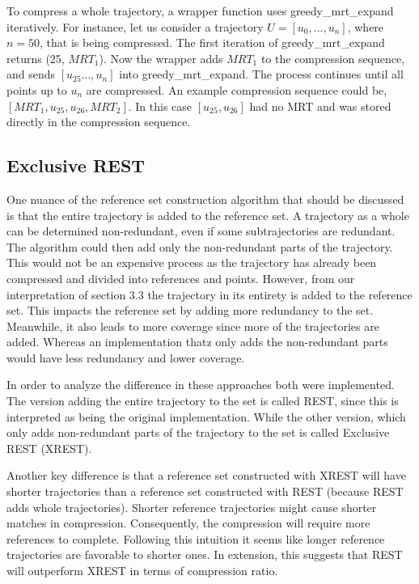 To compress a whole trajectory, a wrapper function uses greedy\_mrt\_expand iteratively. For instance, let us consider a trajectory $U = [u_0, ..., u_n]$, where $n = 50$, that is being compressed. The first iteration of greedy\_mrt\_expand returns (25, $MRT_1$). Now the wrapper adds $MRT_1$ to the compression sequence, and sends $[u_{25} ..., u_n]$ into greedy\_mrt\_expand. The process continues until all points up to $u_n$ are compressed. An example compression sequence could be, $[MRT_1, u_{25}, u_{26}, MRT_2]$. In this case $[u_{25}, u_{26}]$ had no MRT and was stored directly in the compression sequence.

\subsection{Exclusive REST}
One nuance of the reference set construction algorithm that should be discussed is that the entire trajectory is added to the reference set. A trajectory as a whole can be determined non-redundant, even if some subtrajectories are redundant. The algorithm could then add only the non-redundant parts of the trajectory. This would not be an expensive process as the trajectory has already been compressed and divided into references and points. However, from our interpretation of \cite{zhao2018rest} section 3.3 the trajectory in its entirety is added to the reference set. This impacts the reference set by adding more redundancy to the set. Meanwhile, it also leads to more coverage since more of the trajectories are added. Whereas an implementation thatz only adds the non-redundant parts would have less redundancy and lower coverage.

In order to analyze the difference in these approaches both were implemented. The version adding the entire trajectory to the set is called REST, since this is interpreted as being the original implementation. While the other version, which only adds non-redundant parts of the trajectory to the set is called Exclusive REST (XREST).

Another key difference is that a reference set constructed with XREST will have shorter trajectories than a reference set constructed with REST (because REST adds whole trajectories). Shorter reference trajectories might cause shorter matches in compression. Consequently, the compression will require more references to complete. Following this intuition it seems like longer reference trajectories are favorable to shorter ones. In extension, this suggests that REST will outperform XREST in terms of compression ratio.

